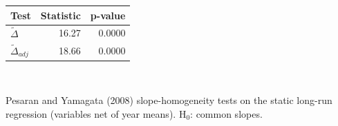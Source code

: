 \begin{tabular}{lrr}\toprule
Test & Statistic & p-value \\
\midrule
$\tilde\Delta$ & 16.27 & 0.0000 \\
$\tilde\Delta_{adj}$ & 18.66 & 0.0000 \\
\bottomrule\end{tabular}
\\[3pt]\begin{minipage}{\tablewidth}\footnotesize Pesaran and Yamagata (2008) slope-homogeneity tests on the static long-run regression (variables net of year means). H$_0$: common slopes.\end{minipage}
